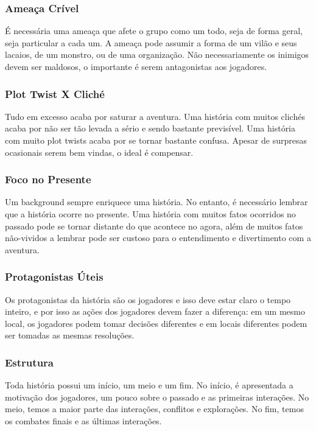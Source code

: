 \documentclass[10pt,twoside,twocolumn]{book}
\begin{document}
\subsubsection*{Ameaça Crível}
É necessária uma ameaça que afete o grupo como um todo, seja de forma geral, seja particular a cada um. A ameaça pode assumir a forma de um vilão e seus lacaios, de um monstro, ou de uma organização. Não necessariamente os inimigos devem ser maldosos, o importante é serem antagonistas aos jogadores.

\subsubsection*{Plot Twist X Cliché}
Tudo em excesso acaba por saturar a aventura. Uma história com muitos clichés acaba por não ser tão levada a sério e sendo bastante previsível. Uma história com muito plot twists acaba por se tornar bastante confusa. Apesar de surpresas ocasionais serem bem vindas, o ideal é compensar.

\subsubsection*{Foco no Presente}
Um background sempre enriquece uma história. No entanto, é necessário lembrar que a história ocorre no presente. Uma história com muitos fatos ocorridos no passado pode se tornar distante do que acontece no agora, além de muitos fatos não-vividos a lembrar pode ser custoso para o entendimento e divertimento com a aventura.

\subsubsection*{Protagonistas Úteis}
Os protagonistas da história são os jogadores e isso deve estar claro o tempo inteiro, e por isso as ações dos jogadores devem fazer a diferença: em um mesmo local, os jogadores podem tomar decisões diferentes e em locais diferentes podem ser tomadas as mesmas resoluções.

\subsubsection*{Estrutura}
Toda história possui um início, um meio e um fim. No início, é apresentada a motivação dos jogadores, um pouco sobre o passado e as primeiras interações. No meio, temos a maior parte das interações, conflitos e explorações. No fim, temos os combates finais e as últimas interações.
\end{document}
